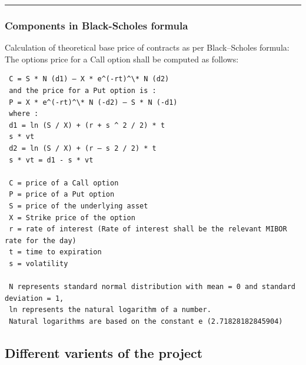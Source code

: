\begin{center}\rule{0.5\linewidth}{0.5pt}\end{center}

\hypertarget{components-in-black-scholes-formula}{%
\subsubsection{Components in Black-Scholes
formula}\label{components-in-black-scholes-formula}}

Calculation of theoretical base price of contracts as per Black--Scholes
formula: The options price for a Call option shall be computed as
follows:

\begin{verbatim}
 C = S * N (d1) – X * e^(-rt)^\* N (d2)
 and the price for a Put option is :
 P = X * e^(-rt)^\* N (-d2) – S * N (-d1)
 where :
 d1 = ln (S / X) + (r + s ^ 2 / 2) * t
 s * vt
 d2 = ln (S / X) + (r – s 2 / 2) * t
 s * vt = d1 - s * vt
 
 C = price of a Call option
 P = price of a Put option
 S = price of the underlying asset
 X = Strike price of the option
 r = rate of interest (Rate of interest shall be the relevant MIBOR rate for the day)
 t = time to expiration
 s = volatility 

 N represents standard normal distribution with mean = 0 and standard deviation = 1, 
 ln represents the natural logarithm of a number. 
 Natural logarithms are based on the constant e (2.71828182845904)
\end{verbatim}

\hypertarget{sec:varients}{%
\subsection{Different varients of the project}\label{sec:varients}}

